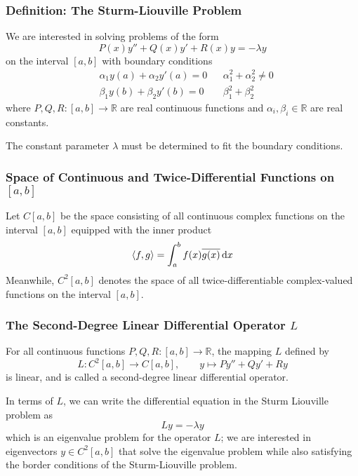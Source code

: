 \documentclass[11pt, a4paper]{article}
\newcommand{\diff}{\mathop{}\!\mathrm{d}} %
\newcommand{\R}{\mathbb{R}} %
\begin{document}
\subsubsection{Definition: The Sturm-Liouville Problem}
We are interested in solving problems of the form
\begin{equation*}
	P(x) y'' + Q(x)y' + R(x) y = - \lambda y
\end{equation*}
on the interval $ [a, b] $ with boundary conditions
\begin{align*}
	&\alpha_1 y(a) + \alpha_2 y'(a) = 0 && \alpha_1^2 + \alpha_2^2 \neq 0\\
	&\beta_1y(b) + \beta_2 y'(b) = 0 &&  \beta_1^2 + \beta_2^2
\end{align*}
where $ P, Q, R : [a, b] \to \R $ are real continuous functions and $ \alpha_i, \beta_i \in \R$ are real constants.

The constant parameter $ \lambda $ must be determined to fit the boundary conditions.


\subsubsection{Space of Continuous and Twice-Differential Functions on $ [a, b] $}
Let $ C[a, b] $ be the space consisting of all continuous complex functions on the interval $ [a, b] $ equipped with the inner product
\begin{equation*}
	\expval{f, g} = \int_{a}^{b} f(x) \overline{g(x)} \diff x
\end{equation*}
Meanwhile, $ C^2[a, b] $ denotes the space of all twice-differentiable complex-valued functions on the interval $ [a, b] $.

\subsubsection{The Second-Degree Linear Differential Operator $ L $}
For all continuous functions $ P, Q, R:[a, b] \to \R $, the mapping $ L $ defined by
\begin{equation*}
	L : C^2[a, b] \to C[a, b], \qquad y \mapsto Py'' + Qy' + Ry 
\end{equation*}
is linear, and is called a second-degree linear differential operator. 

In terms of $ L $, we can write the differential equation in the Sturm Liouville problem as
\begin{equation*}
	Ly = -\lambda y
\end{equation*}
which is an eigenvalue problem for the operator $ L $; we are interested in eigenvectors $ y \in C^2[a, b] $ that solve the eigenvalue problem while also satisfying the border conditions of the Sturm-Liouville problem. 
\end{document}
